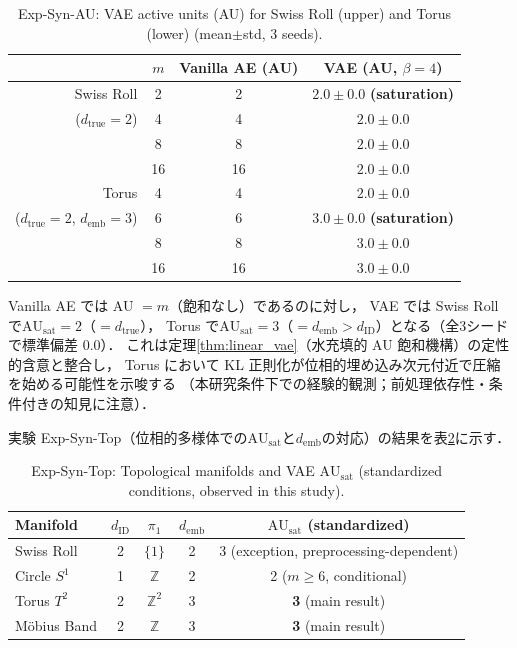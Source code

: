 \documentclass[11pt,a4paper]{jsarticle}
\newcommand{\dID}{d_{\mathrm{ID}}}
\newcommand{\dtrue}{d_{\mathrm{true}}}
\newcommand{\AUsat}{\mathrm{AU}_{\mathrm{sat}}}
\newcommand{\demb}{d_{\mathrm{emb}}}
\begin{document}
\begin{table}[H]
\centering
\caption{Exp-Syn-AU: VAE active units (AU) for Swiss Roll (upper) and Torus (lower) (mean$\pm$std, 3 seeds).}
\label{tab:ea_summary}
\small
\begin{tabular}{rccc}
\toprule
 & $m$ & Vanilla AE (AU) & VAE (AU, $\beta=4$) \\
\midrule
Swiss Roll & 2 & 2 & $2.0\pm0.0$ \textbf{(saturation)} \\
($d_\mathrm{true}=2$) & 4 & 4 & $2.0\pm0.0$ \\
 & 8 & 8 & $2.0\pm0.0$ \\
 & 16 & 16 & $2.0\pm0.0$ \\
\midrule
Torus & 4 & 4 & $2.0\pm0.0$ \\
($d_\mathrm{true}=2$, $d_\mathrm{emb}=3$) & 6 & 6 & $3.0\pm0.0$ \textbf{(saturation)} \\
 & 8 & 8 & $3.0\pm0.0$ \\
 & 16 & 16 & $3.0\pm0.0$ \\
\bottomrule
\end{tabular}
\end{table}

Vanilla AE では AU $= m$（飽和なし）であるのに対し，
VAE では Swiss Roll で$\AUsat = 2$（$= \dtrue$），
Torus で$\AUsat = 3$（$= \demb > \dID$）となる（全3シードで標準偏差 0.0）．
これは定理\ref{thm:linear_vae}（水充填的 AU 飽和機構）の定性的含意と整合し，
Torus において KL 正則化が位相的埋め込み次元付近で圧縮を始める可能性を示唆する
（本研究条件下での経験的観測；前処理依存性・条件付きの知見に注意）．

実験 Exp-Syn-Top（位相的多様体での$\AUsat$と$\demb$の対応）の結果を表\ref{tab:eb_summary}に示す．

\begin{table}[H]
\centering
\caption{Exp-Syn-Top: Topological manifolds and VAE $\AUsat$ (standardized conditions, observed in this study).}
\label{tab:eb_summary}
\small
\begin{tabular}{lcccc}
\toprule
Manifold & $\dID$ & $\pi_1$ & $\demb$ & $\AUsat$ (standardized) \\
\midrule
Swiss Roll   & 2 & $\{1\}$        & 2 & 3 (exception, preprocessing-dependent)\\
Circle $S^1$ & 1 & $\mathbb{Z}$   & 2 & 2 ($m \geq 6$, conditional)\\
Torus $T^2$  & 2 & $\mathbb{Z}^2$ & 3 & \textbf{3} (main result)\\
Möbius Band  & 2 & $\mathbb{Z}$   & 3 & \textbf{3} (main result)\\
\bottomrule
\end{tabular}
\end{table}
\end{document}

